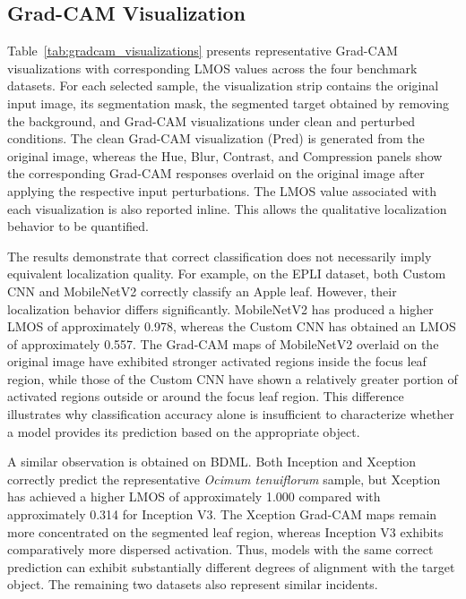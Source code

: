 \documentclass[a4paper,fleqn]{cas-dc}
\begin{document}
\subsection{Grad-CAM Visualization}
\label{sec:gradcam_visualization}

Table~\ref{tab:gradcam_visualizations} presents representative Grad-CAM visualizations with corresponding LMOS values across the four benchmark datasets. For each selected sample, the visualization strip contains the original input image, its segmentation mask, the segmented target obtained by removing the background, and Grad-CAM visualizations under clean and perturbed conditions. The clean Grad-CAM visualization (Pred) is generated from the original image, whereas the Hue, Blur, Contrast, and Compression panels show the corresponding Grad-CAM responses overlaid on the original image after applying the respective input perturbations. The LMOS value associated with each visualization is also reported inline. This allows the qualitative localization behavior to be quantified. 

The results demonstrate that correct classification does not necessarily imply equivalent localization quality. For example, on the EPLI dataset, both Custom CNN and MobileNetV2 correctly classify an Apple leaf. However, their localization behavior differs significantly. MobileNetV2 has produced a higher LMOS of approximately 0.978, whereas the Custom CNN has obtained an LMOS of approximately 0.557. The Grad-CAM maps of MobileNetV2 overlaid on the original image have exhibited stronger activated regions inside the focus leaf region, while those of the Custom CNN have shown a relatively greater portion of activated regions outside or around the focus leaf region. This difference illustrates why classification accuracy alone is insufficient to characterize whether a model provides its prediction based on the appropriate object.

A similar observation is obtained on BDML. Both Inception and Xception correctly predict the representative \textit{Ocimum tenuiflorum} sample, but Xception has achieved a higher LMOS of approximately 1.000 compared with approximately 0.314 for Inception V3. The Xception Grad-CAM maps remain more concentrated on the segmented leaf region, whereas Inception V3 exhibits comparatively more dispersed activation. Thus, models with the same correct prediction can exhibit substantially different degrees of alignment with the target object. The remaining two datasets also represent similar incidents.
\end{document}
